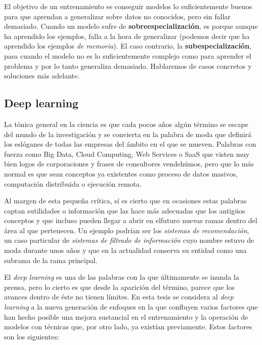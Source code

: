 El objetivo de un entrenamiento es conseguir modelos lo suficientemente buenos para que aprendan a generalizar sobre datos no conocidos, pero sin fallar demasiado. Cuando un modelo sufre de \textbf{sobreespecialización}, es porque aunque ha aprendido los ejemplos, falla a la hora de generalizar (podemos decir que ha aprendido los ejemplos \textit{de memoria}). El caso contrario, la \textbf{subespecialización}, pasa cuando el modelo no es lo suficientemente complejo como para aprender el problema y por lo tanto generaliza demasiado. Hablaremos de casos concretos y soluciones más adelante.

\subsection{Deep learning}

La tónica general en la ciencia es que cada pocos años algún término se escape del mundo de la investigación y se convierta en la palabra de moda que definirá los eslóganes de todas las empresas del ámbito en el que se mueven. Palabras con fuerza como Big Data, Cloud Computing, Web Services o SaaS que visten muy bien logos de corporaciones y frases de consultores vendehúmos, pero que lo más normal es que sean conceptos ya existentes como proceso de datos masivos, computación distribuida o ejecución remota.

Al margen de esta pequeña crítica, sí es cierto que en ocasiones estas palabras captan sutilidades o información que las hace más adecuadas que los antigüos conceptos y que incluso pueden llegar a abrir en elfuturo nuevas ramas dentro del área al que pertenecen. Un ejemplo podrían ser los \textit{sistemas de recomendación}, un caso particular de \textit{sistemas de filtrado de información} cuyo nombre estuvo de moda durante unos años y que en la actualidad conserva su entidad como una subrama de la rama principal.

El \textit{deep learning} es una de las palabras con la que últimamente se inunda la prensa, pero lo cierto es que desde la aparición del término, parece que los avances dentro de éste no tienen límites. En esta tesis se considera al \textit{deep learning} a la nueva generación de enfoques en la que confluyen varios factores que han hecho posible una mejora sustancial en el entrenamiento y la operación de modelos con técnicas que, por otro lado, ya existían previamente. Estos factores son los siguientes:

